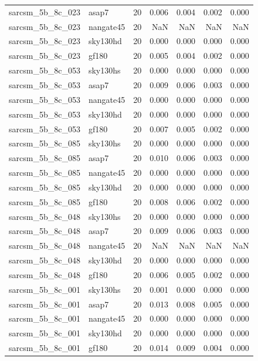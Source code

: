 \begin{tabular}{llrrrrr}
sarcsm\_5b\_8c\_023 & asap7 & 20 & 0.006 & 0.004 & 0.002 & 0.000 \\
sarcsm\_5b\_8c\_023 & nangate45 & 20 & NaN & NaN & NaN & NaN \\
sarcsm\_5b\_8c\_023 & sky130hd & 20 & 0.000 & 0.000 & 0.000 & 0.000 \\
sarcsm\_5b\_8c\_023 & gf180 & 20 & 0.005 & 0.004 & 0.002 & 0.000 \\
sarcsm\_5b\_8c\_053 & sky130hs & 20 & 0.000 & 0.000 & 0.000 & 0.000 \\
sarcsm\_5b\_8c\_053 & asap7 & 20 & 0.009 & 0.006 & 0.003 & 0.000 \\
sarcsm\_5b\_8c\_053 & nangate45 & 20 & 0.000 & 0.000 & 0.000 & 0.000 \\
sarcsm\_5b\_8c\_053 & sky130hd & 20 & 0.000 & 0.000 & 0.000 & 0.000 \\
sarcsm\_5b\_8c\_053 & gf180 & 20 & 0.007 & 0.005 & 0.002 & 0.000 \\
sarcsm\_5b\_8c\_085 & sky130hs & 20 & 0.000 & 0.000 & 0.000 & 0.000 \\
sarcsm\_5b\_8c\_085 & asap7 & 20 & 0.010 & 0.006 & 0.003 & 0.000 \\
sarcsm\_5b\_8c\_085 & nangate45 & 20 & 0.000 & 0.000 & 0.000 & 0.000 \\
sarcsm\_5b\_8c\_085 & sky130hd & 20 & 0.000 & 0.000 & 0.000 & 0.000 \\
sarcsm\_5b\_8c\_085 & gf180 & 20 & 0.008 & 0.006 & 0.002 & 0.000 \\
sarcsm\_5b\_8c\_048 & sky130hs & 20 & 0.000 & 0.000 & 0.000 & 0.000 \\
sarcsm\_5b\_8c\_048 & asap7 & 20 & 0.009 & 0.006 & 0.003 & 0.000 \\
sarcsm\_5b\_8c\_048 & nangate45 & 20 & NaN & NaN & NaN & NaN \\
sarcsm\_5b\_8c\_048 & sky130hd & 20 & 0.000 & 0.000 & 0.000 & 0.000 \\
sarcsm\_5b\_8c\_048 & gf180 & 20 & 0.006 & 0.005 & 0.002 & 0.000 \\
sarcsm\_5b\_8c\_001 & sky130hs & 20 & 0.001 & 0.000 & 0.000 & 0.000 \\
sarcsm\_5b\_8c\_001 & asap7 & 20 & 0.013 & 0.008 & 0.005 & 0.000 \\
sarcsm\_5b\_8c\_001 & nangate45 & 20 & 0.000 & 0.000 & 0.000 & 0.000 \\
sarcsm\_5b\_8c\_001 & sky130hd & 20 & 0.000 & 0.000 & 0.000 & 0.000 \\
sarcsm\_5b\_8c\_001 & gf180 & 20 & 0.014 & 0.009 & 0.004 & 0.000 \\

\end{tabular}
